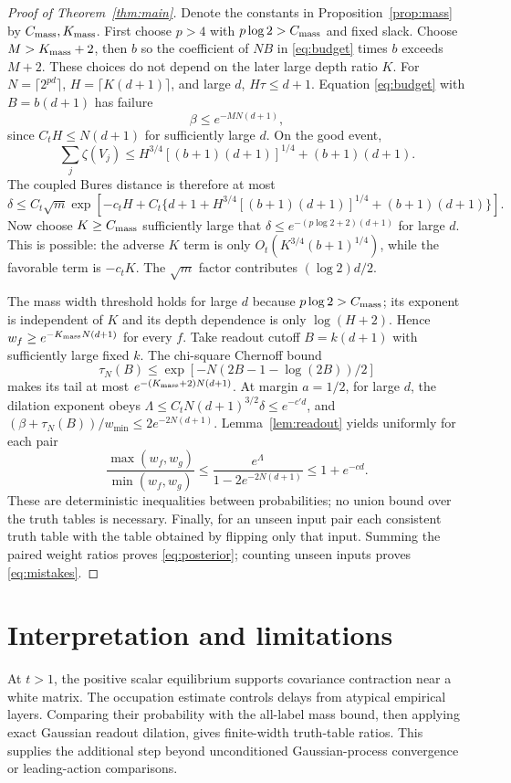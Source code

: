 \documentclass[11pt]{article}
\begin{document}
\begin{proof}[Proof of Theorem~\ref{thm:main}]
Denote the constants in Proposition~\ref{prop:mass} by $C_{\rm mass},K_{\rm mass}$. First choose $p>4$ with $p\log2>C_{\rm mass}$ and fixed slack. Choose $M>K_{\rm mass}+2$, then $b$ so the coefficient of $NB$ in \eqref{eq:budget} times $b$ exceeds $M+2$. These choices do not depend on the later large depth ratio $K$.
For $N=\lceil2^{pd}\rceil$, $H=\lceil K(d+1)\rceil$, and large $d$, $H\tau\le d+1$. Equation \eqref{eq:budget} with $B=b(d+1)$ has failure
\begin{equation}\label{eq:betafinal}
 \beta\le e^{-MN(d+1)},
\end{equation}
since $C_tH\le N(d+1)$ for sufficiently large $d$. On the good event,
\[
 \sum_j\zeta(V_j)\le H^{3/4}[(b+1)(d+1)]^{1/4}+(b+1)(d+1).
\]
The coupled Bures distance is therefore at most
\begin{equation}\label{eq:deltafinal}
 \delta\le C_t\sqrt m\exp\!\left[-c_tH+C_t\{d+1+
 H^{3/4}[(b+1)(d+1)]^{1/4}+(b+1)(d+1)\}\right].
\end{equation}
Now choose $K\ge C_{\rm mass}$ sufficiently large that
$\delta\le e^{-(p\log2+2)(d+1)}$ for large $d$. This is possible: the adverse $K$ term is only $O_t(K^{3/4}(b+1)^{1/4})$, while the favorable term is $-c_tK$. The $\sqrt m$ factor contributes $(\log2)d/2$.

The mass width threshold holds for large $d$ because $p\log2>C_{\rm mass}$; its exponent is independent of $K$ and its depth dependence is only $\log(H+2)$. Hence $w_f\ge e^{-K_{\rm mass}N(d+1)}$ for every $f$. Take readout cutoff $B=k(d+1)$ with sufficiently large fixed $k$. The chi-square Chernoff bound
\[
 \tau_N(B)\le\exp[-N(2B-1-\log(2B))/2]
\]
makes its tail at most $e^{-(K_{\rm mass}+2)N(d+1)}$. At margin $a=1/2$, for large $d$, the dilation exponent obeys
$\Lambda\le C_tN(d+1)^{3/2}\delta\le e^{-c'd}$,
and $(\beta+\tau_N(B))/w_{\min}\le2e^{-2N(d+1)}$.
Lemma~\ref{lem:readout} yields uniformly for each pair
\[
 \frac{\max(w_f,w_g)}{\min(w_f,w_g)}
 \le\frac{e^\Lambda}{1-2e^{-2N(d+1)}}\le1+e^{-cd}.
\]
These are deterministic inequalities between probabilities; no union bound over the truth tables is necessary.
Finally, for an unseen input pair each consistent truth table with the table obtained by flipping only that input. Summing the paired weight ratios proves \eqref{eq:posterior}; counting unseen inputs proves \eqref{eq:mistakes}.
\end{proof}

\section{Interpretation and limitations}
At $t>1$, the positive scalar equilibrium supports covariance contraction
near a white matrix. The occupation estimate controls delays from atypical
empirical layers. Comparing their probability with the all-label mass
bound, then applying exact Gaussian readout dilation, gives finite-width
truth-table ratios. This supplies the additional step beyond unconditioned
Gaussian-process convergence or leading-action comparisons.
\end{document}
